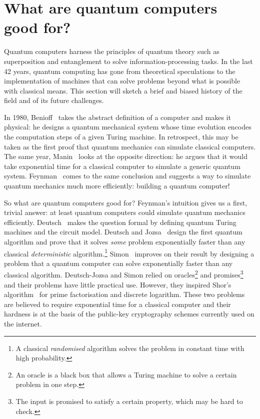 
\section*{What are quantum computers good for?}


Quantum computers harness the principles of quantum theory such as superposition and entanglement to solve information-processing tasks.
In the last 42 years, quantum computing has gone from theoretical speculations to the implementation of machines that can solve problems beyond what is possible with classical means.
This section will sketch a brief and biased history of the field and of its future challenges.

In 1980, Benioff~\cite{Benioff80} takes the abstract definition of a computer and makes it physical: he designs a quantum mechanical system whose time evolution encodes the computation steps of a given Turing machine.
In retrospect, this may be taken as the first proof that quantum mechanics can simulate classical computers.
The same year, Manin~\cite{Manin80} looks at the opposite direction: he argues that it would take exponential time for a classical computer to simulate a generic quantum system.
Feynman~\cite{Feynman82,Feynman85} comes to the same conclusion and suggests a way to simulate quantum mechanics much more efficiently: building a quantum computer!

So what are quantum computers good for? Feynman's intuition gives us a first, trivial answer: at least quantum computers could simulate quantum mechanics efficiently. Deutsch~\cite{Deutsch85a} makes the question formal by defining quantum Turing machines and the circuit model.
Deutsch and Jozsa~\cite{DeutschJozsa92} design the first quantum algorithm and prove that it solves \emph{some} problem exponentially faster than any classical \emph{deterministic} algorithm.\footnote
{A classical \emph{randomised} algorithm solves the problem in constant time with high probability.}
Simon~\cite{Simon94} improves on their result by designing a problem that a quantum computer can solve exponentially faster than any classical algorithm.
Deutsch-Jozsa and Simon relied on oracles\footnote{An oracle is a black box that allows a Turing machine to solve a certain problem in one step.}
and promises\footnote{The input is promised to satisfy a certain property, which may be hard to check.} and their problems have little practical use.
However, they inspired Shor's algorithm~\cite{Shor94a} for prime factorisation and discrete logarithm. These two problems are believed to require exponential time for a classical computer and their hardness is at the basis of the public-key cryptography schemes currently used on the internet.

